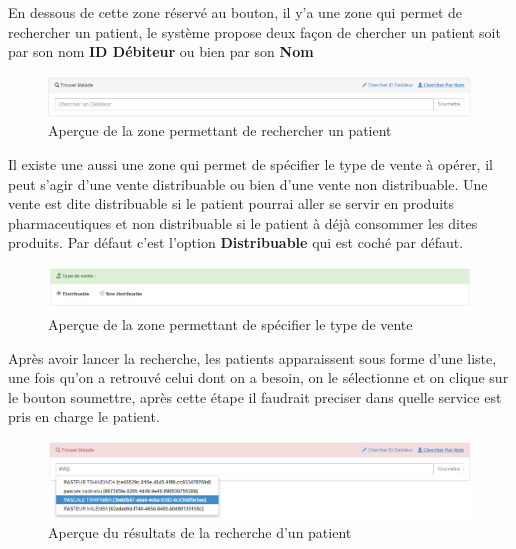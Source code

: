 \documentclass[12pt,a4paper]{report}
\begin{document}
En dessous de cette zone réservé au bouton, il y'a une zone qui permet de rechercher un patient, le système propose deux façon de chercher un patient soit par son nom\textbf{ ID Débiteur} ou bien par son \textbf{Nom} 

\begin{figure}[h]
\begin{center}
\includegraphics[width=14cm]{pic/foundPatient.png}
\end{center}
\caption{Aperçue de la zone permettant de rechercher un patient}
\label{Aperçue de la zone permettant de rechercher un patient}
\end{figure}

Il existe une aussi une zone qui permet de spécifier le type de vente à opérer, il peut s'agir d'une vente distribuable ou bien d'une vente non distribuable. Une vente est dite distribuable si le patient pourrai aller se servir en produits pharmaceutiques et non distribuable si le patient à déjà consommer les dites produits. Par défaut c'est l'option \textbf{Distribuable} qui est coché par défaut.  

\begin{figure}[h]
\begin{center}
\includegraphics[width=14cm]{pic/TypeVente.png}
\end{center}
\caption{Aperçue de la zone permettant de spécifier le type de vente}
\label{Aperçue de la zone permettant de spécifier le type de vente}
\end{figure}

Après avoir lancer la recherche, les patients apparaissent sous forme d'une liste, une fois qu'on a retrouvé celui dont on a besoin, on le sélectionne et on clique sur le bouton soumettre, après cette étape il faudrait preciser dans quelle service est pris en charge le patient.

\begin{figure}[h]
\begin{center}
\includegraphics[width=14cm]{pic/PatientTrouver.png}
\end{center}
\caption{Aperçue du résultats de la recherche d'un patient}
\label{Aperçue du résultats de la recherche d'un patient}
\end{figure}
\end{document}
